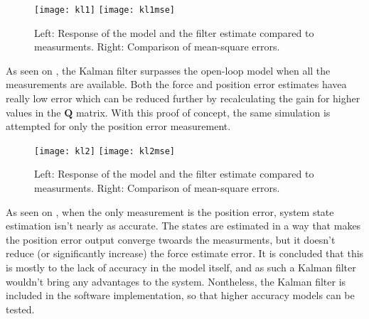\begin{figure}[H]
\centering
\hspace{-2.5em}\texttt{[image: kl1]}
\hspace{-2.5em}\texttt{[image: kl1mse]}
\caption{Left: Response of the model and the filter estimate compared to measurments. Right: Comparison of mean-square errors.}
\label{fig:kl1}
\end{figure}

As seen on , the Kalman filter surpasses the open-loop model when all the measurements are available.
Both the force and position error estimates havea really low error which can be reduced further by recalculating the gain for higher values in the $\mathbf{Q}$ matrix.
With this proof of concept, the same simulation is attempted for only the position error measurement.

\begin{figure}[H]
\centering
\hspace{-2.5em}\texttt{[image: kl2]}
\hspace{-2.5em}\texttt{[image: kl2mse]}
\caption{Left: Response of the model and the filter estimate compared to measurments. Right: Comparison of mean-square errors.}
\label{fig:kl2}
\end{figure}

As seen on , when the only measurement is the position error, system state estimation isn't nearly as accurate.
The states are estimated in a way that makes the position error output converge twoards the measurments, but it doesn't reduce (or significantly increase) the force estimate error.
It is concluded that this is mostly to the lack of accuracy in the model itself, and as such a Kalman filter wouldn't bring any advantages to the system.
Nontheless, the Kalman filter is included in the software implementation, so that higher accuracy models can be tested.

%		
